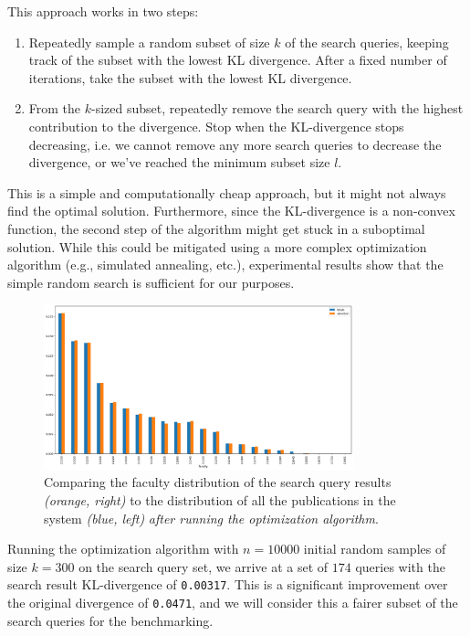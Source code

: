This approach works in two steps:

\begin{enumerate}
    \item Repeatedly sample a random subset of size $k$ of the search queries, keeping track of the subset with the lowest KL divergence.
After a fixed number of iterations, take the subset with the lowest KL divergence.
    \item From the $k$-sized subset, repeatedly remove the search query with the highest contribution to the divergence.
Stop when the KL-divergence stops decreasing, i.e. we cannot remove any more search queries to decrease the divergence, or we've reached the minimum subset size $l$.
\end{enumerate}

This is a simple and computationally cheap approach, but it might not always find the optimal solution.
Furthermore, since the KL-divergence is a non-convex function, the second step of the algorithm might get stuck in a suboptimal solution.
While this could be mitigated using a more complex optimization algorithm (e.g., simulated annealing, etc.), experimental results show that the simple random search is sufficient for our purposes.

\begin{figure}[ht!]
    \captionsetup{width=.9\linewidth}
    \includegraphics[width=0.8\textwidth]{../img/all-queries-vs-totals-corrected.png}
    \centering
    \caption{Comparing the faculty distribution of the search query results \textit{(orange, right)} to the distribution of all the publications in the system \textit{(blue, left)} \textit{after running the optimization algorithm}.}
\end{figure}

Running the optimization algorithm with $n = 10000$ initial random samples of size $k = 300$ on the search query set, we arrive at a set of $174$ queries with the search result KL-divergence of \texttt{0.00317}. 
This is a significant improvement over the original divergence of \texttt{0.0471}, and we will consider this a fairer subset of the search queries for the benchmarking.

